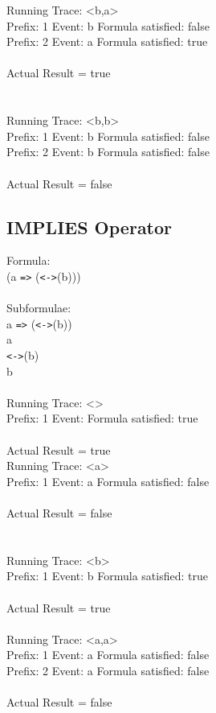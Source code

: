 \noindent Running Trace: \textless b,a\textgreater\\
  Prefix: 1 Event: b Formula satisfied: false\\
  Prefix: 2 Event: a Formula satisfied: true\\
\\
Actual Result = true\\
\\
\\
Running Trace: \textless b,b\textgreater\\
  Prefix: 1 Event: b Formula satisfied: false\\
  Prefix: 2 Event: b Formula satisfied: false\\
\\
Actual Result = false\\

\subsection{IMPLIES Operator}

Formula:\\
(a \texttt{=>} (\texttt{<->}(b)))\\
\\
Subformulae:\\
a \texttt{=>} (\texttt{<->}(b))\\
a\\
\texttt{<->}(b)\\
b\\
\\
Running Trace: \textless \textgreater\\
  Prefix: 1 Event:  Formula satisfied: true\\
\\
Actual Result = true\\

\noindent Running Trace: \textless a\textgreater\\
  Prefix: 1 Event: a Formula satisfied: false\\
\\
Actual Result = false\\
\\
\\
Running Trace: \textless b\textgreater\\
  Prefix: 1 Event: b Formula satisfied: true\\
\\
Actual Result = true\\
\\
Running Trace: \textless a,a\textgreater\\
  Prefix: 1 Event: a Formula satisfied: false\\
  Prefix: 2 Event: a Formula satisfied: false\\
\\
Actual Result = false\\
\\
\newpage

